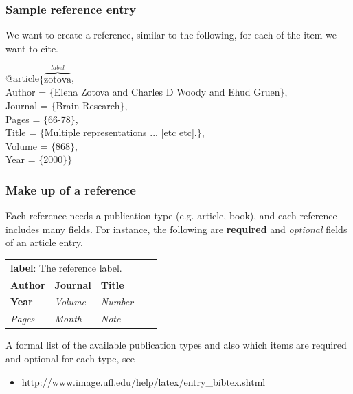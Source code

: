 \begin{frame}  \frametitle{Sample reference entry}
	We want to create a reference, similar to the following, for each of the item we want to cite.
	
	\vspace{7mm}
	
	@article$\{\overbrace{\text{zotova}}^{label}$, \\
	\hspace{3mm}	Author = $\{$Elena Zotova and Charles D Woody and Ehud Gruen$\}$, \\
	\hspace{3mm}	Journal = $\{$Brain Research$\}$, \\
	\hspace{3mm}	Pages = $\{$66-78$\}$, \\
	\hspace{3mm}	Title = $\{$Multiple representations ... [etc etc].$\}$, \\
	\hspace{3mm}	Volume = $\{$868$\}$, \\
	\hspace{3mm}	Year = $\{$2000$\}\}$ \\
\end{frame}

\begin{frame}  \frametitle{Make up of a reference}
	Each reference needs a publication type (e.g. article, book), and each reference includes many fields. For instance, the following are \textbf{required} and \textit{optional} fields of an article entry.
	\begin{center}
		\begin{tabular}{lllrr}
			\multicolumn{5}{l}{\textbf{label}: The reference label.} \\
			\textbf{Author} & \textbf{Journal} & \textbf{Title} & \hspace{5mm} & \\
			\textbf{Year} & \textit{Volume} & \textit{Number} \\
			\textit{Pages} & \textit{Month} & \textit{Note}
		\end{tabular}
	\end{center}
	A formal list of the available publication types and also which items are required and optional for each type, see
	\begin{itemize}
		\item[]\color{highlight}http://www.image.ufl.edu/help/latex/entry\_bibtex.shtml
	\end{itemize}
\end{frame}

